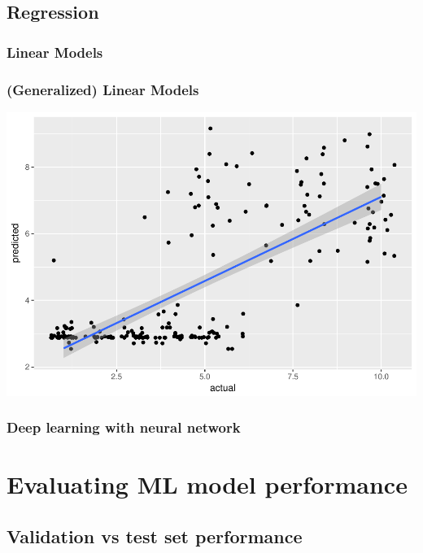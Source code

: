 \documentclass[handout, t, 11pt, xcolor=svgnames, hyperref={colorlinks,citecolor=DeepPink4,linkcolor=DarkRed,urlcolor=DarkBlue}]{beamer} %
\begin{document}
\subsection{Regression}

\subsubsection{Linear Models}

\begin{frame}
	\frametitle{(Generalized) Linear Models}
	
	\begin{center}\includegraphics[width=1\textwidth]{webinar_code_files/figure-latex/unnamed-chunk-21-1.pdf} \end{center}
\end{frame}

\subsubsection{Deep learning with neural network}




\section{Evaluating ML model performance}

\subsection{Validation vs test set performance}
\end{document}
